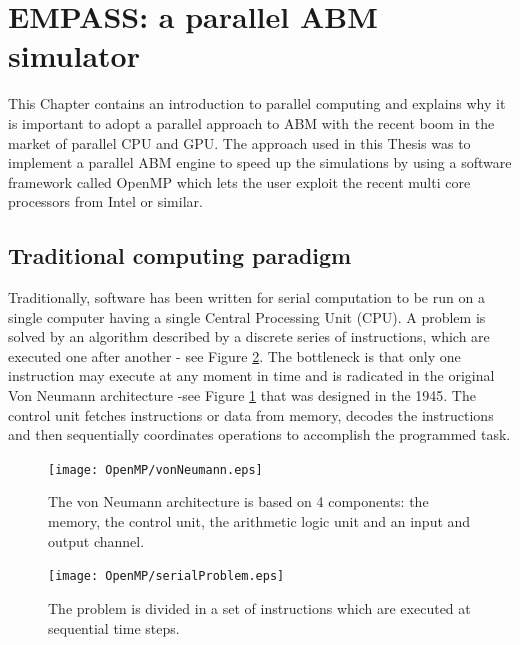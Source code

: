 \lstset{language=C++}
\section{EMPASS: a parallel ABM simulator}
This Chapter contains an introduction to parallel computing and explains
why it is important to adopt a parallel approach to ABM with the recent
boom in the market of parallel CPU
and GPU.
The approach used in this Thesis was to implement a parallel ABM engine to speed
 up the simulations by using a software framework called OpenMP which lets the user
exploit the recent multi core processors from Intel or similar.
\subsection{Traditional computing paradigm}
Traditionally, software has been written for serial computation to be run on
a single computer having a single Central Processing Unit (CPU).
A problem is solved by an algorithm described by a discrete series of instructions,
 which are executed one after another - see Figure \ref{Fig:Parallel:serialProblem}.
The bottleneck is that only one instruction may execute at any moment in time
 and is radicated in the original Von Neumann architecture -see Figure \ref{Fig:Parallel:Neumann}
that was designed in the 1945.
The control unit fetches instructions or data from memory, decodes the instructions
and then sequentially coordinates operations to accomplish the programmed task.

\begin{figure}[htbp]
\begin{center}
\texttt{[image: OpenMP/vonNeumann.eps]}
\end{center}
\small{
\caption[Von Neumann architecture]{
The von Neumann architecture is based on 4 components:
the memory, the control unit, the arithmetic logic unit and
an input and output channel.
\label{Fig:Parallel:Neumann}}}
\end{figure}

\begin{figure}[htbp]
\begin{center}
\texttt{[image: OpenMP/serialProblem.eps]}
\end{center}
\small{
\caption[Serial Problem computation]{
The problem is divided in a set of instructions which are executed
at sequential time steps.
\label{Fig:Parallel:serialProblem}}}
\end{figure}

